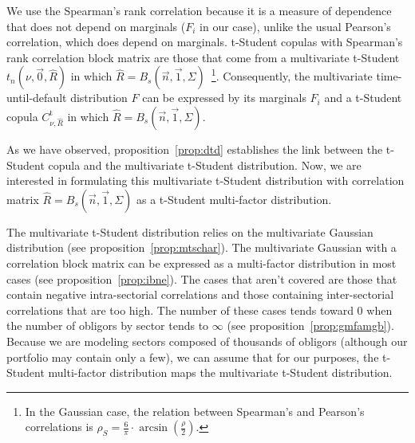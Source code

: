 \documentclass[11pt,fleqn]{book} %
\begin{document}
We use the Spearman's rank correlation because it is a measure of dependence 
that does not depend on marginals ($F_i$ in our case), unlike the usual
Pearson's correlation, which does depend on marginals. t-Student copulas 
with Spearman's rank correlation block matrix are those that come from a 
multivariate t-Student $t_n(\nu,\vec{0},\widehat{R})$ in which 
$\widehat{R} = B_s(\vec{n},\vec{1},\Sigma)$~\footnote{ In the Gaussian case, 
the relation between Spearman's and Pearson's correlations is 
$\rho_S = \frac{6}{\pi}\cdot \arcsin(\frac{\rho}{2})$.}. Consequently, 
the multivariate time-until-default distribution $F$ can be expressed by 
its marginals $F_i$ and a t-Student copula $C_{\nu,\widehat{R}}^{\text{t}}$ 
in which $\widehat{R} = B_s(\vec{n},\vec{1},\Sigma)$.

As we have observed, proposition~\ref{prop:dtd} establishes the link between 
the t-Student copula and the multivariate t-Student distribution. Now, we are
interested in formulating this multivariate t-Student distribution with 
correlation matrix $\widehat{R} = B_s(\vec{n},\vec{1},\Sigma)$ as a t-Student 
multi-factor distribution.

The multivariate t-Student distribution relies on the multivariate Gaussian
distribution (see proposition~\ref{prop:mtschar}). The multivariate Gaussian 
with a correlation block matrix can be expressed as a multi-factor distribution
in most cases (see proposition~\ref{prop:ibne}). The cases that aren't covered 
are those that contain negative intra-sectorial correlations and those 
containing inter-sectorial correlations that are too high. The number of these 
cases tends toward $0$ when the number of obligors by sector tends to $\infty$ 
(see proposition~\ref{prop:gmfamgb}). Because we are modeling sectors composed 
of thousands of obligors (although our portfolio may contain only a few), we 
can assume that for our purposes, the t-Student multi-factor distribution maps 
the multivariate t-Student distribution.
\end{document}
